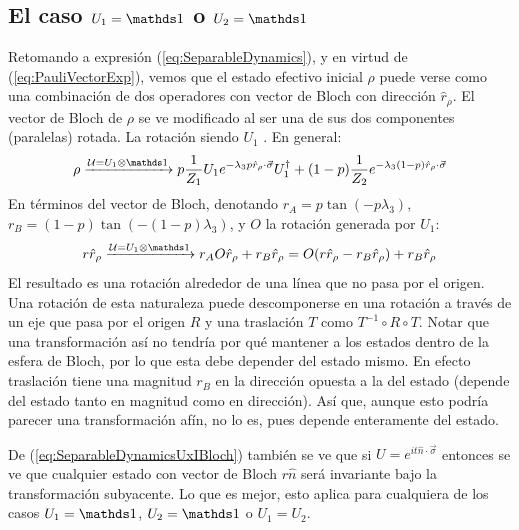 \subsection{El caso $U_{1}=\Id$ o $U_{2}=\Id$}
Retomando a expresión (\ref{eq:SeparableDynamics}), y en virtud de (\ref{eq:PauliVectorExp}), vemos que el estado efectivo inicial $\rho$ puede verse como una combinación de dos operadores con vector de Bloch con dirección $\hat{r}_{\rho}$. El vector de Bloch de $\rho$ se ve modificado al ser una de sus dos componentes (paralelas) rotada. La rotación siendo $U_{1}$ . En general:
\begin{equation}\label{eq:SeparableDynamicsUxI}
    \rho\xrightarrow{\mcU=U_{1}\otimes \Id} p\frac{1}{Z_{1}}U_{1}e^{-\lambda_{3}p\hat{r}_{\rho}\cdot\vec{\sigma}}U_{1}^{\dag}+(1-p)\frac{1}{Z_{2}}e^{-\lambda_{3}(1-p)\hat{r}_{\rho}\cdot\vec{\sigma}}
\end{equation}
En términos del vector de Bloch, denotando $r_{A}=p\tan(-p\lambda_{3})$, $r_{B}=(1-p)\tan(-(1-p)\lambda_{3})$, y $O$ la rotación generada por $U_{1}$:
\begin{equation}
    r\hat{r}_{\rho}\xrightarrow{\mcU=U_{1}\otimes \Id}r_{A}O\hat{r}_{\rho}+r_{B}\hat{r}_{\rho}=O(r\hat{r}_{\rho}-r_{B}\hat{r}_{\rho})+r_{B}\hat{r}_{\rho}
\end{equation}\label{eq:SeparableDynamicsUxIBloch}
El resultado es una rotación alrededor de una línea que no pasa por el origen. Una rotación de esta naturaleza puede descomponerse en una rotación a través de un eje que pasa por el origen $R$ y una traslación $T$ como $T^{-1}\circ R\circ T$. Notar que una transformación así no tendría por qué mantener a los estados dentro de la esfera de Bloch, por lo que esta debe depender del estado mismo. En efecto traslación tiene una magnitud $r_{B}$ en la dirección opuesta a la del estado (depende del estado tanto en magnitud como en dirección). Así que, aunque esto podría parecer una transformación afín, no lo es, pues depende enteramente del estado.

De (\ref{eq:SeparableDynamicsUxIBloch}) también se ve que si $U=e^{it\hat{n}\cdot\vec{\sigma}}$ entonces se ve que cualquier estado con vector de Bloch $r\hat{n}$ será invariante bajo la transformación subyacente. Lo que es mejor, esto aplica para cualquiera de los casos $U_{1}=\Id$, $U_{2}=\Id$ o $U_{1}=U_{2}$.


